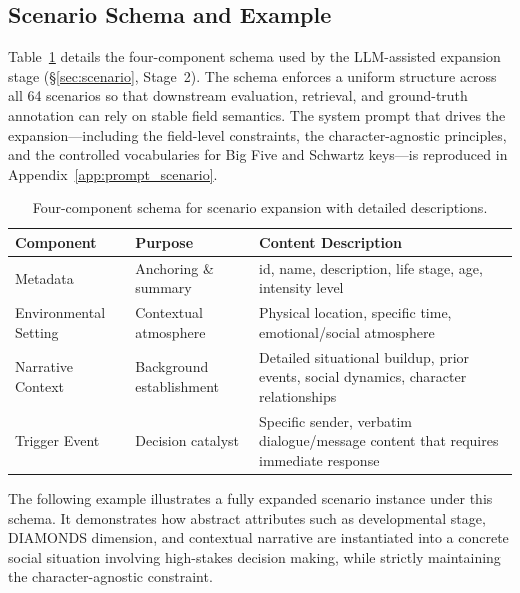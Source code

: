 \subsection{Scenario Schema and Example}
\label{app:scenario_schema}

Table~\ref{tab:scenario_components} details the four-component schema used by the LLM-assisted expansion stage (\S\ref{sec:scenario}, Stage~2). The schema enforces a uniform structure across all 64 scenarios so that downstream evaluation, retrieval, and ground-truth annotation can rely on stable field semantics. The system prompt that drives the expansion---including the field-level constraints, the character-agnostic principles, and the controlled vocabularies for Big Five and Schwartz keys---is reproduced in Appendix~\ref{app:prompt_scenario}.

\begin{table}[h]
\centering
\caption{Four-component schema for scenario expansion with detailed descriptions.}
\label{tab:scenario_components}
\setlength{\tabcolsep}{2.5pt}
\small
\begin{tabularx}{\textwidth}{p{2.8cm}p{3.1cm}X}
\toprule
\textbf{Component} & \textbf{Purpose} & \textbf{Content Description} \\
\midrule
Metadata & Anchoring \& summary & id, name, description, life stage, age, intensity level \\
\midrule
Environmental Setting & Contextual atmosphere & Physical location, specific time, emotional/social atmosphere \\
\midrule
Narrative Context & Background establishment & Detailed situational buildup, prior events, social dynamics, character relationships \\
\midrule
Trigger Event & Decision catalyst & Specific sender, verbatim dialogue/message content that requires immediate response \\
\bottomrule
\end{tabularx}
\end{table}

The following example illustrates a fully expanded scenario instance under this schema. It demonstrates how abstract attributes such as developmental stage, DIAMONDS dimension, and contextual narrative are instantiated into a concrete social situation involving high-stakes decision making, while strictly maintaining the character-agnostic constraint.
\label{app:ExampleofScenario}

